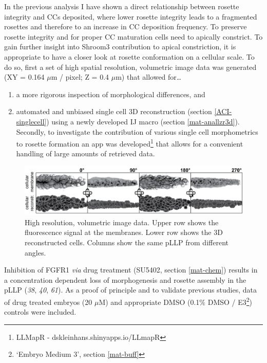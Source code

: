 \documentclass[11pt,singlespacinge,twoside]{reedthesis} %
\providecommand{\tightlist}{%
  \setlength{\itemsep}{0pt}\setlength{\parskip}{0pt}}
\theoremstyle{definition}
\theoremstyle{definition}
\theoremstyle{definition}
\theoremstyle{remark}
\begin{document}
In the previous analysis I have shown a direct relationship between rosette integrity and CCs deposited, where lower rosette integrity leads to a fragmented rosettes and therefore to an increase in CC deposition frequency. To preserve rosette integrity and for proper CC maturation cells need to apically constrict. To gain further insight into Shroom3 contribution to apical constriction, it is appropriate to have a closer look at rosette conformation on a cellular scale. To do so, first a set of high spatial resolution, volumetric image data was generated (XY = 0.164 \(\mu\)m / pixel; Z = 0.4 \(\mu\)m) that allowed for\ldots{}
\begin{enumerate}
\def\labelenumi{\arabic{enumi}.}
\tightlist
\item
  a more rigorous inspection of morphological differences, and
\item
  automated and unbiased single cell 3D reconstruction (section \ref{ACI-singlecell}) using a newly developed IJ macro (section \ref{mat-anallzr3d}). Secondly, to investigate the contribution of various single cell morphometrics to rosette formation an app was developed\footnote{LLMapR - dskleinhans.shinyapps.io/LLmapR} that allows for a convenient handling of large amounts of retrieved data.
\end{enumerate}

\begin{figure}[H]

{\centering \includegraphics[width=0.95\linewidth]{figures/results/04_constriction/reconstriction_data} 

}

\caption[High resolution, volumetric image data]{High resolution, volumetric image data. Upper row shows the fluorescence signal at the membranes. Lower row shows the 3D reconstructed cells. Columns show the same pLLP from different angles.}\label{fig:acdata}
\end{figure}
Inhibition of FGFR1 \emph{via} drug treatment (SU5402, section \ref{mat-chem}) results in a concentration dependent loss of morphogenesis and rosette assembly in the pLLP (\emph{38}, \emph{40}, \emph{61}). As a proof of principle and to validate previous studies, data of drug treated embryos (20 \(\mu\)M) and appropriate DMSO (0.1\(\%\) DMSO / E3\footnote{`Embryo Medium 3', section \ref{mat-buff}}) controls were included.
\end{document}
